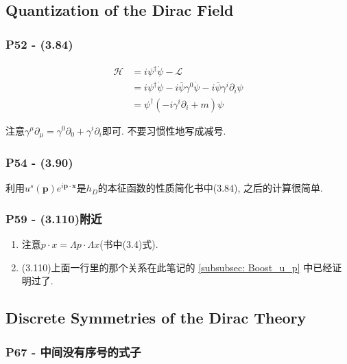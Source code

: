 \documentclass[cn,hazy,blue,11pt,device=normal,chinesefont=founder]{elegantnote}
\begin{document}
\subsection{Quantization of the Dirac Field}

\subsubsection{{P52} - (3.84)}
\begin{align*}
  \mathcal{H} &= i {\psi}^\dagger \dot{\psi} - \mathcal{L}\\
  &= i {\psi}^\dagger \dot{\psi} - i \bar{\psi} \gamma^0 \dot{\psi} - i \bar{\psi} \gamma^i \partial_i \psi\\
  &= {\psi}^\dagger (-i \gamma^i \partial_i + m) \psi
\end{align*}

\begin{remark}
  注意$\gamma^\mu \partial_\mu = \gamma^0 \partial_0 + \gamma^i \partial_i$即可. 不要习惯性地写成减号. 
\end{remark}


\subsubsection{P54 - (3.90)}

利用$u^s(\mathbf{p})e^{i\mathbf{p} \cdot \mathbf{x}}$是$h_D$的本征函数的性质简化书中(3.84), 之后的计算很简单. 

\subsubsection{P59 - (3.110)附近}
\begin{enumerate}
  \item 注意$p\cdot x = \Lambda p\cdot \Lambda x$(书中(3.4)式).
  \item (3.110)上面一行里的那个关系在此笔记的 \ref{subsubsec: Boost_u_p} 中已经证明过了. 
\end{enumerate}

\subsection{Discrete Symmetries of the Dirac Theory}

\subsubsection{P67 - 中间没有序号的式子} 
\end{document}
